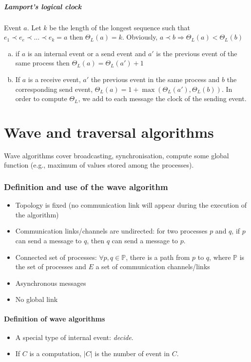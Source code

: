 \subsubsection{Lamport's logical clock}
Event $a$.
Let $k$ be the length of the longest sequence such that $e_1 \prec e_e\prec ... \prec e_k=a$ then $\Theta_L(a)=k$. Obviously, $a\prec b \Rightarrow \Theta_L(a) < \Theta_L(b)$
\begin{enumerate}[a.]
\item if $a$ is an internal event or a send event and $a'$ is the previous event of the same process then $\Theta_L (a)=\Theta_L(a')+1$
\item If $a$ is a receive event, $a'$ the previous event in the same process and $b$ the corresponding send event, $\Theta_L(a) = 1 + \max (\Theta_L (a'), \Theta_L (b) )$. In order to compute $\Theta_L$, we add to each message the clock of the sending event.
\end{enumerate}

\newpage
\setcounter{section}{0}
\part{Wave and traversal algorithms}

Wave algorithms cover broadcasting, synchronisation, compute some global function (e.g., maximum of values stored among the processes).

\section{Definition and use of the wave algorithm}
\begin{itemize}
\item Topology is fixed (no communication link will appear during the execution of the algorithm)
\item Communication links/channels are undirected: for two processes $p$ and $q$, if $p$ can send a message to $q$, then $q$ can send a message to $p$.
\item Connected set of processes: $\forall p,q \in \mathbb{P}$, there is a path from $p$ to $q$, where $\mathbb{P}$ is the set of processes and $E$ a set of communication channels/links
\item Asynchronous messages
\item No global link
\end{itemize}

\subsection{Definition of wave algorithms}
\begin{itemize}
\item A special type of internal event: \emph{decide}.
\item If $C$ is a computation, $|C|$ is the number of event in $C$.
\end{itemize}

